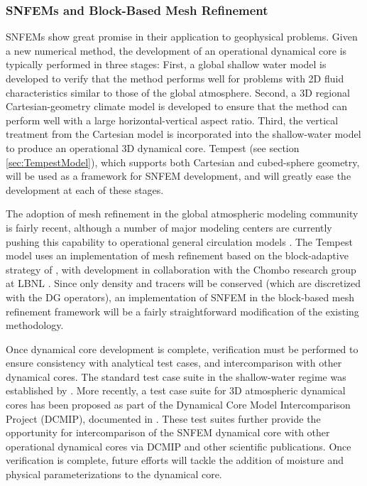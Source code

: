 \documentclass[11pt]{article}
\begin{document}
\subsubsection{SNFEMs and Block-Based Mesh Refinement} \label{sec:HorizontalSNFEM}

SNFEMs show great promise in their application to geophysical problems.  Given a new numerical method, the development of an operational dynamical core is typically performed in three stages:  First, a global shallow water model is developed to verify that the method performs well for problems with 2D fluid characteristics similar to those of the global atmosphere.  Second, a 3D regional Cartesian-geometry climate model is developed to ensure that the method can perform well with a large horizontal-vertical aspect ratio.  Third, the vertical treatment from the Cartesian model is incorporated into the shallow-water model to produce an operational 3D dynamical core.  Tempest (see section \ref{sec:TempestModel}), which supports both Cartesian and cubed-sphere geometry, will be used as a framework for SNFEM development, and will greatly ease the development at each of these stages.

The adoption of mesh refinement in the global atmospheric modeling community is fairly recent, although a number of major modeling centers are currently pushing this capability to operational general circulation models \citep{WCSJBKMGDLDFSHPTDR2012MWR, LMHSJL2013MWR, CMZCJMAT2013MWR}.  The Tempest model uses an implementation of mesh refinement based on the block-adaptive strategy of \cite{MJBPC1989JCP}, with development in collaboration with the Chombo research group at LBNL \citep{ChomboDesign}.  Since only density and tracers will be conserved (which are discretized with the DG operators), an implementation of SNFEM in the block-based mesh refinement framework will be a fairly straightforward modification of the existing methodology.

Once dynamical core development is complete, verification must be performed to ensure consistency with analytical test cases, and intercomparison with other dynamical cores.  The standard test case suite in the shallow-water regime was established by \cite{WDHJS1992JCP}.  More recently, a test case suite for 3D atmospheric dynamical cores has been proposed as part of the Dynamical Core Model Intercomparison Project (DCMIP), documented in \cite{DCMIP2012TESTCASES}.  These test suites further provide the opportunity for intercomparison of the SNFEM dynamical core with other operational dynamical cores via DCMIP and other scientific publications.  Once verification is complete, future efforts will tackle the addition of moisture and physical parameterizations to the dynamical core.
\end{document}
